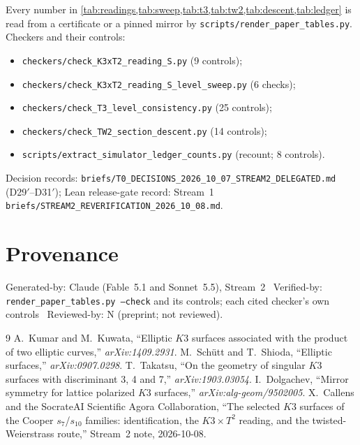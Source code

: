 \documentclass[11pt,a4paper]{article}
\theoremstyle{remark}
\begin{document}
Every number in \cref{tab:readings,tab:sweep,tab:t3,tab:tw2,tab:descent,tab:ledger} is read from a certificate or a pinned mirror by
\nolinkurl{scripts/render_paper_tables.py}. Checkers and their controls:
\begin{itemize}\small
\item \nolinkurl{checkers/check_K3xT2_reading_S.py} (9 controls);
\item \nolinkurl{checkers/check_K3xT2_reading_S_level_sweep.py} (6 checks);
\item \nolinkurl{checkers/check_T3_level_consistency.py} (25 controls);
\item \nolinkurl{checkers/check_TW2_section_descent.py} (14 controls);
\item \nolinkurl{scripts/extract_simulator_ledger_counts.py} (recount; 8 controls).
\end{itemize}
Decision records: \nolinkurl{briefs/T0_DECISIONS_2026_10_07_STREAM2_DELEGATED.md} (D29$'$--D31$'$);
Lean release-gate record: Stream~1 \nolinkurl{briefs/STREAM2_REVERIFICATION_2026_10_08.md}.

\section*{Provenance}
Generated-by: Claude (Fable~5.1 and Sonnet~5.5), Stream~2 \textbar\ Verified-by: \texttt{render\_paper\_tables.py --check} and its
controls; each cited checker's own controls \textbar\ Reviewed-by: N (preprint; not reviewed).

\begin{thebibliography}{9}
 A.~Kumar and M.~Kuwata, ``Elliptic $K3$ surfaces associated with the product of two elliptic curves,''
  \textit{arXiv:1409.2931}.
 M.~Sch\"utt and T.~Shioda, ``Elliptic surfaces,'' \textit{arXiv:0907.0298}.
 T.~Takatsu, ``On the geometry of singular $K3$ surfaces with discriminant 3, 4 and 7,'' \textit{arXiv:1903.03054}.
 I.~Dolgachev, ``Mirror symmetry for lattice polarized $K3$ surfaces,'' \textit{arXiv:alg-geom/9502005}.
 X.~Callens and the SocrateAI Scientific Agora Collaboration, ``The selected $K3$ surfaces of the Cooper $s_7$/$s_{10}$
  families: identification, the $K3\times T^2$ reading, and the twisted-Weierstrass route,'' Stream~2 note, 2026-10-08.
\end{thebibliography}
\end{document}
